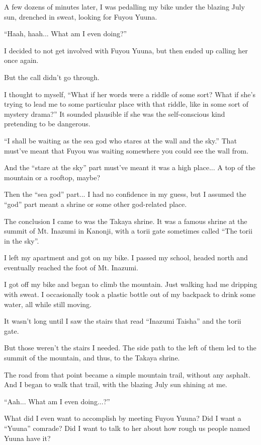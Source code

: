 A few dozens of minutes later, I was pedalling my bike under the blazing July sun, drenched in sweat, looking for Fuyou Yuuna.

``Haah, haah... What am I even doing?''

I decided to not get involved with Fuyou Yuuna, but then ended up calling her once again.

But the call didn't go through.

I thought to myself, ``What if her words were a riddle of some sort? What if she's trying to lead me to some particular place with that riddle, like in some sort of mystery drama?'' It sounded plausible if she was the self-conscious kind pretending to be dangerous.

``I shall be waiting as the sea god who stares at the wall and the sky.'' That must've meant that Fuyou was waiting somewhere you could see the wall from.

And the ``stare at the sky'' part must've meant it was a high place... A top of the mountain or a rooftop, maybe?

Then the ``sea god'' part... I had no confidence in my guess, but I assumed the ``god'' part meant a shrine or some other god-related place.

The conclusion I came to was the Takaya shrine. It was a famous shrine at the summit of Mt. Inazumi in Kanonji, with a torii gate sometimes called ``The torii in the sky''.

I left my apartment and got on my bike. I passed my school, headed north and eventually reached the foot of Mt. Inazumi.

I got off my bike and began to climb the mountain. Just walking had me dripping with sweat. I occasionally took a plastic bottle out of my backpack to drink some water, all while still moving.

It wasn't long until I saw the stairs that read ``Inazumi Taisha'' and the torii gate.

But those weren't the stairs I needed. The side path to the left of them led to the summit of the mountain, and thus, to the Takaya shrine.

The road from that point became a simple mountain trail, without any asphalt. And I began to walk that trail, with the blazing July sun shining at me.

``Aah... What am I even doing...?''

What did I even want to accomplish by meeting Fuyou Yuuna? Did I want a ``Yuuna'' comrade? Did I want to talk to her about how rough us people named Yuuna have it?

